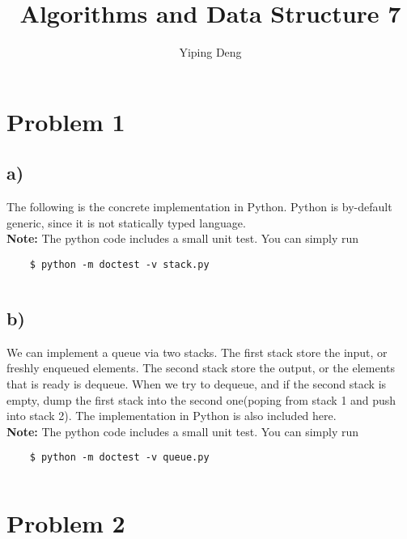 \documentclass{article}
\newcommand{\hwnumber}{7}
\begin{document}
\title{Algorithms and Data Structure \hwnumber}
\author{Yiping Deng}
\maketitle
\thispagestyle{fancy}
\section*{Problem 1}
\subsection*{a)}
The following is the concrete implementation in Python. Python is by-default generic, since it is not statically typed language. \\
\textbf{Note:} The python code includes a small unit test. You can simply run
\begin{verbatim}
    $ python -m doctest -v stack.py
\end{verbatim}
\begin{framed}
\inputminted{python}{stack.py}
\end{framed}
\subsection*{b)}
We can implement a queue via two stacks. The first stack store the input, or freshly enqueued elements. The second stack store the output, or the elements
that is ready is dequeue.
When we try to dequeue, and if the second stack is empty, dump the first stack into the second one(poping from stack 1 and push into stack 2).
The implementation in Python is also included here.\\
\textbf{Note:} The python code includes a small unit test. You can simply run
\begin{verbatim}
    $ python -m doctest -v queue.py
\end{verbatim}
\begin{framed}
\inputminted{python}{queue.py}
\end{framed}
\section*{Problem 2}
\end{document}
